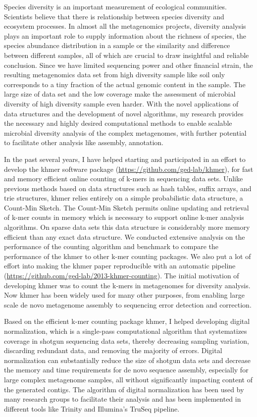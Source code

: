 \documentclass[12pt]{article}
\theoremstyle{plain} \numberwithin{equation}{section}
\theoremstyle{definition}
\newcounter{list}
\begin{document}
 Species diversity is an important measurement of ecological communities. Scientists 
believe that there is relationship between species diversity and ecosystem processes.
 In almost all the metagenomics projects, diversity analysis plays an important role to supply information 
 about the richness of species, the species abundance
distribution in a sample or the similarity and difference between different 
samples, all of which are crucial to draw insightful and reliable conclusion. Since we have limited
 sequencing power and other financial strain, the resulting metagenomics data set from 
 high diversity sample like soil only corresponds to a tiny fraction of the actual genomic
 content in the sample. The large size of data set and the low coverage make the assessment of microbial 
 diversity of high diversity sample even harder. With the novel applications of data structures and the development 
 of novel algorithms, my research provides the necessary and highly desired computational methods to enable 
 scalable microbial diversity analysis of the complex metagenomes, with further potential to facilitate other analysis like assembly, annotation.


 In the past several years, I have helped starting and participated in an effort to develop the khmer software package (\url{https://github.com/ged-lab/khmer}), for fast and memory efficient online counting of k-mers in sequencing data sets. Unlike previous methods based on data structures such as hash tables, suffix arrays, and trie structures, khmer relies entirely on a simple probabilistic data structure, a Count-Min Sketch. The Count-Min Sketch permits online updating and retrieval of k-mer counts in memory which is necessary to support online k-mer analysis algorithms. On sparse data sets this data structure is considerably more memory efficient than any exact data structure.
 We conducted extensive  analysis on the performance of the counting algorithm and benchmark to compare the performance of the khmer to other k-mer counting packages. 
  We also put a lot of effort into making the khmer paper reproducible with an automatic pipeline (\url{https://github.com/ged-lab/2013-khmer-counting}). The initial motivation of developing khmer was to count the k-mers in metagenomes for diversity analysis. Now khmer has been widely used for many other purposes, from  enabling large scale de novo metagenome assembly to sequencing error detection and correction.
  
 Based on the efficient k-mer counting package khmer, I helped developing digital normalization, which is a single-pass computational algorithm that systematizes coverage in shotgun sequencing data sets, thereby decreasing sampling variation, discarding redundant data, and removing the majority of errors. Digital normalization can substantially reduce the size of shotgun data sets and decrease the memory and time requirements for de novo sequence assembly, especially for large complex metagenome samples, all without significantly impacting content of the generated contigs. The algorithm of digital normalization has been used by many research groups to facilitate their analysis and has been implemented in different tools like Trinity and  Illumina's TruSeq pipeline.
\end{document}
